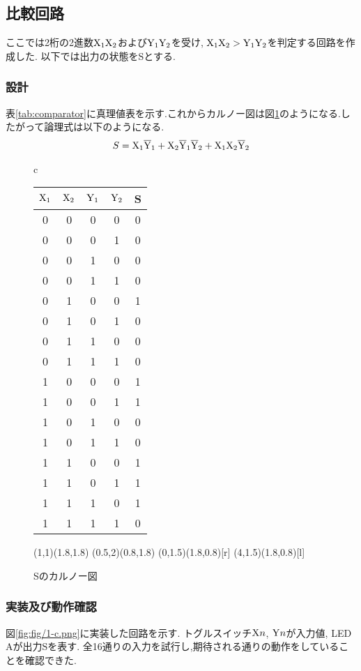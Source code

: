 \subsection{比較回路}
ここでは2桁の2進数${\rm X}_1{\rm X}_2$および${\rm Y}_1{\rm Y}_2$を受け,
${\rm X}_1{\rm X}_2>{\rm Y}_1{\rm Y}_2$を判定する回路を作成した.
以下では出力の状態をSとする.
\subsubsection{設計}
表\ref{tab:comparator}に真理値表を示す.これからカルノー図は図\ref{fig:karnaugh1c}のようになる.したがって論理式は以下のようになる.
\begin{align}
  S={\rm X}_1{\rm\overline{Y}}_1+{\rm X}_2{\rm\overline{Y}}_1{\rm\overline{Y}}_2+{\rm X}_1{\rm X}_2{\rm\overline{Y}}_2
\end{align}
\begin{figure}[h]
  \begin{tabular}{c}
    \begin{minipage}[t]{.48\textwidth}
      \centering
      \begin{tabular}{cccc|c}
        \hline
        ${\rm X}_1$ & ${\rm X}_2$ & ${\rm Y}_1$ & ${\rm Y}_2$ & S\\
        \hline
        0 & 0 & 0 & 0 & 0 \\
        0 & 0 & 0 & 1 & 0 \\
        0 & 0 & 1 & 0 & 0 \\
        0 & 0 & 1 & 1 & 0 \\
        0 & 1 & 0 & 0 & 1 \\
        0 & 1 & 0 & 1 & 0 \\
        0 & 1 & 1 & 0 & 0 \\
        0 & 1 & 1 & 1 & 0 \\
        1 & 0 & 0 & 0 & 1 \\
        1 & 0 & 0 & 1 & 1 \\
        1 & 0 & 1 & 0 & 0 \\
        1 & 0 & 1 & 1 & 0 \\
        1 & 1 & 0 & 0 & 1 \\
        1 & 1 & 0 & 1 & 1 \\
        1 & 1 & 1 & 0 & 1 \\
        1 & 1 & 1 & 1 & 0 \\
        \hline
      \end{tabular}
      \label{tab:comparator}
    \end{minipage}
    \hfill
    \begin{minipage}[c]{.48\textwidth}
      \centering
      {%
      \color{red}\put(1,1){\oval(1.8,1.8)}
      \color{green}\put(0.5,2){\oval(0.8,1.8)}
      \color{blue}\put(0,1.5){\oval(1.8,0.8)[r]}
      \color{blue}\put(4,1.5){\oval(1.8,0.8)[l]}
      }
      \caption{Sのカルノー図}
      \label{fig:karnaugh1c}
    \end{minipage}
  \end{tabular}
\end{figure}
\clearpage
\subsubsection{実装及び動作確認}
図\ref{fig:fig/1-c.png}に実装した回路を示す.
トグルスイッチ${\rm X}n$, ${\rm Y}n$が入力値,
LED Aが出力Sを表す.
全16通りの入力を試行し,期待される通りの動作をしていることを確認できた.
